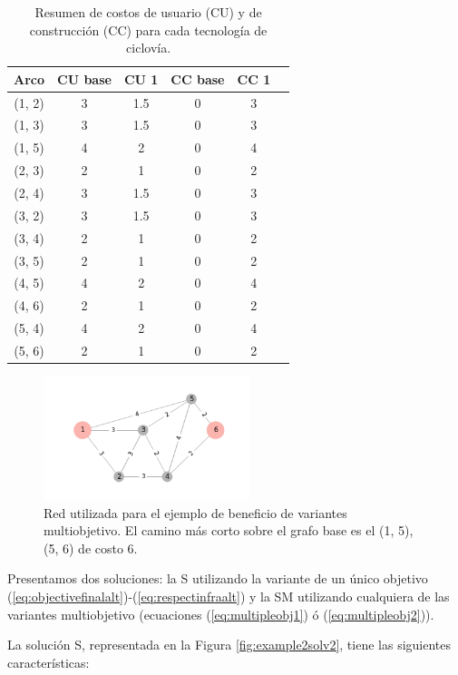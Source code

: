 \begin{table}[h!]
  \centering
  \begin{tabular}{cccccc}
    \toprule
    Arco & CU base & CU 1 & CC base & CC 1 & \\
    \midrule
      (1, 2) & 3 & 1.5 & 0 & 3 \\
      (1, 3) & 3 & 1.5 & 0 & 3 \\
      (1, 5) & 4 & 2   & 0 & 4 \\
      (2, 3) & 2 & 1   & 0 & 2 \\
      (2, 4) & 3 & 1.5 & 0 & 3 \\
      (3, 2) & 3 & 1.5 & 0 & 3 \\
      (3, 4) & 2 & 1   & 0 & 2 \\
      (3, 5) & 2 & 1   & 0 & 2 \\
      (4, 5) & 4 & 2   & 0 & 4 \\
      (4, 6) & 2 & 1   & 0 & 2 \\
      (5, 4) & 4 & 2   & 0 & 4 \\
      (5, 6) & 2 & 1   & 0 & 2 \\
    \bottomrule
  \end{tabular}
    \caption{Resumen de costos de usuario (CU) y de construcción (CC) para cada tecnología de ciclovía.}\label{table:example2arccosts}
\end{table}

\begin{figure}[h!]
  \centering
  \includegraphics[width=6cm]{../resources/example_2_base.png}
  \caption{Red utilizada para el ejemplo de beneficio de variantes multiobjetivo. El camino más corto sobre el grafo base es el (1, 5), (5, 6) de costo 6.}
  \label{fig:example2base}
\end{figure}

\FloatBarrier

Presentamos dos soluciones: la S utilizando la variante de un único objetivo (\ref{eq:objectivefinalalt})-(\ref{eq:respectinfraalt}) y la SM utilizando cualquiera de las variantes multiobjetivo (ecuaciones (\ref{eq:multipleobj1}) ó (\ref{eq:multipleobj2})).

La solución S, representada en la Figura \ref{fig:example2solv2}, tiene las siguientes características:

